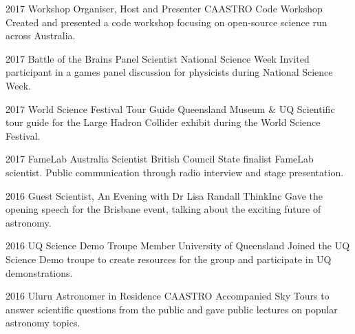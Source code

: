 \begin{entrylist}
\entry
    {2017}
    {Workshop Organiser, Host and Presenter}
    {CAASTRO Code Workshop}
    {Created and presented a code workshop focusing on open-source science run across Australia.}
\end{entrylist}
\begin{entrylist}
\entry
    {2017}
    {Battle of the Brains Panel Scientist}
    {National Science Week}
    {Invited participant in a games panel discussion for physicists during National Science Week.}
\end{entrylist}
\begin{entrylist}
\entry
    {2017}
    {World Science Festival Tour Guide}
    {Queensland Museum \& UQ}
    {Scientific tour guide for the Large Hadron Collider exhibit during the World Science Festival.}
\end{entrylist}
\begin{entrylist}
\entry
    {2017}
    {FameLab Australia Scientist}
    {British Council}
    {State finalist FameLab scientist. Public communication through radio interview and stage presentation.}
\end{entrylist}
\begin{entrylist}
\entry
    {2016}
    {Guest Scientist, An Evening with Dr Lisa Randall}
    {ThinkInc}
    {Gave the opening speech for the Brisbane event, talking about the exciting future of astronomy.}
\end{entrylist}
\begin{entrylist}
\entry
    {2016}
    {UQ Science Demo Troupe Member}
    {University of Queensland}
    {Joined the UQ Science Demo troupe to create resources for the group and participate in UQ demonstrations.}
\end{entrylist}
\begin{entrylist}
\entry
    {2016}
    {Uluru Astronomer in Residence}
    {CAASTRO}
    {Accompanied Sky Tours to answer scientific questions from the public and gave public lectures on popular astronomy topics.}
\end{entrylist}



